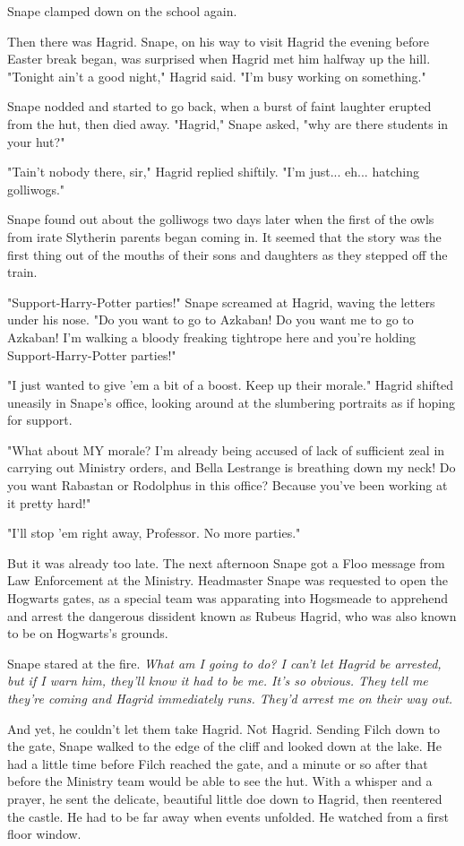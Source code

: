 Snape clamped down on the school again.

Then there was Hagrid. Snape, on his way to visit Hagrid the evening before Easter break began, was surprised when Hagrid met him halfway up the hill. "Tonight ain't a good night," Hagrid said. "I'm busy working on something."

Snape nodded and started to go back, when a burst of faint laughter erupted from the hut, then died away. "Hagrid," Snape asked, "why are there students in your hut?"

"Tain't nobody there, sir," Hagrid replied shiftily. "I'm just... eh... hatching golliwogs."

Snape found out about the golliwogs two days later when the first of the owls from irate Slytherin parents began coming in. It seemed that the story was the first thing out of the mouths of their sons and daughters as they stepped off the train.

"Support-Harry-Potter parties!" Snape screamed at Hagrid, waving the letters under his nose. "Do you want to go to Azkaban! Do you want me to go to Azkaban! I'm walking a bloody freaking tightrope here and you're holding Support-Harry-Potter parties!"

"I just wanted to give 'em a bit of a boost. Keep up their morale." Hagrid shifted uneasily in Snape's office, looking around at the slumbering portraits as if hoping for support.

"What about MY morale? I'm already being accused of lack of sufficient zeal in carrying out Ministry orders, and Bella Lestrange is breathing down my neck! Do you want Rabastan or Rodolphus in this office? Because you've been working at it pretty hard!"

"I'll stop 'em right away, Professor. No more parties."

But it was already too late. The next afternoon Snape got a Floo message from Law Enforcement at the Ministry. Headmaster Snape was requested to open the Hogwarts gates, as a special team was apparating into Hogsmeade to apprehend and arrest the dangerous dissident known as Rubeus Hagrid, who was also known to be on Hogwarts's grounds.

Snape stared at the fire. \emph{What am I going to do? I can't let Hagrid be arrested, but if I warn him, they'll know it had to be me. It's so obvious. They tell me they're coming and Hagrid immediately runs. They'd arrest me on their way out.}

And yet, he couldn't let them take Hagrid. Not Hagrid. Sending Filch down to the gate, Snape walked to the edge of the cliff and looked down at the lake. He had a little time before Filch reached the gate, and a minute or so after that before the Ministry team would be able to see the hut. With a whisper and a prayer, he sent the delicate, beautiful little doe down to Hagrid, then reentered the castle. He had to be far away when events unfolded. He watched from a first floor window.

